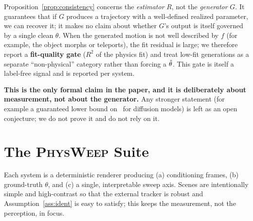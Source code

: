 \documentclass[10pt,twocolumn,letterpaper]{article}
\begin{document}
\begin{remark}
Proposition~\ref{prop:consistency} concerns the \emph{estimator} $R$, not the
\emph{generator} $G$. It guarantees that if $G$ produces a trajectory with a
well-defined realized parameter, we can recover it; it makes no claim about
whether $G$'s output is itself governed by a single clean $\theta$. When the
generated motion is not well described by $f$ (for example, the object morphs
or teleports), the fit residual is large; we therefore report a
\textbf{fit-quality gate} ($R^2$ of the physics fit) and treat low-fit
generations as a separate ``non-physical'' category rather than forcing a
$\hat{\theta}$. This gate is itself a label-free signal and is reported per system.
\end{remark}

\textbf{This is the only formal claim in the paper, and it is deliberately
about measurement, not about the generator.} Any stronger statement (for
example a guaranteed lower bound on \PRI\ for diffusion models) is left as an
open conjecture; we do not prove it and do not rely on it.

\section{The \textsc{PhysWeep} Suite}
\label{sec:suite}

Each system is a deterministic renderer producing (a) conditioning frames, (b)
ground-truth $\theta$, and (c) a single, interpretable sweep axis. Scenes are
intentionally simple and high-contrast so that the external tracker is robust
and Assumption~\ref{ass:ident} is easy to satisfy; this keeps the measurement,
not the perception, in focus.
\end{document}
